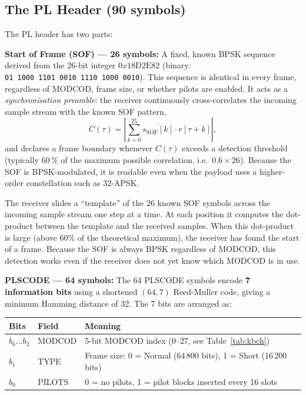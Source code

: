 \documentclass[12pt,a4paper]{report}
\begin{document}
\subsection{The PL Header (90 symbols)}

The PL header has two parts:

\textbf{Start of Frame (SOF) --- 26 symbols:}
A fixed, known BPSK sequence derived from the 26-bit integer
$0x18\text{D}2\text{E}82$ (binary: \texttt{01~1000~1101~0010~1110~1000~0010}).
This sequence is identical in every frame, regardless of MODCOD, frame size,
or whether pilots are enabled. It acts as a \emph{synchronisation preamble}:
the receiver continuously cross-correlates the incoming sample stream with the
known SOF pattern,
\begin{equation}
    C(\tau) = \left|\sum_{k=0}^{25} \overline{s_\text{SOF}[k]}\cdot r[\tau+k]\right|,
\end{equation}
and declares a frame boundary whenever $C(\tau)$ exceeds a detection threshold
(typically 60\,\% of the maximum possible correlation, i.e.\ $0.6\times26$).
Because the SOF is BPSK-modulated, it is readable even when the payload uses a
higher-order constellation such as 32-APSK.

\begin{plainenglish}
The receiver slides a ``template'' of the 26 known SOF symbols across the incoming
sample stream one step at a time.  At each position it computes the dot-product
between the template and the received samples.  When this dot-product is large
(above 60\% of the theoretical maximum), the receiver has found the start of a
frame.  Because the SOF is always BPSK regardless of MODCOD, this detection works
even if the receiver does not yet know which MODCOD is in use.
\end{plainenglish}

\textbf{PLSCODE --- 64 symbols:}
The 64 PLSCODE symbols encode \textbf{7 information bits} using a shortened
$(64,7)$ Reed-Muller code, giving a minimum Hamming distance of 32.  The 7
bits are arranged as:

\begin{center}
\begin{tabular}{lll}
\toprule
Bits & Field & Meaning \\
\midrule
$b_6\ldots b_2$ & MODCOD & 5-bit MODCOD index (0--27, see Table~\ref{tab:kbch}) \\
$b_1$           & TYPE   & Frame size: 0 = Normal (64\,800 bits), 1 = Short (16\,200 bits) \\
$b_0$           & PILOTS & 0 = no pilots, 1 = pilot blocks inserted every 16 slots \\
\bottomrule
\end{tabular}
\end{center}
\end{document}

